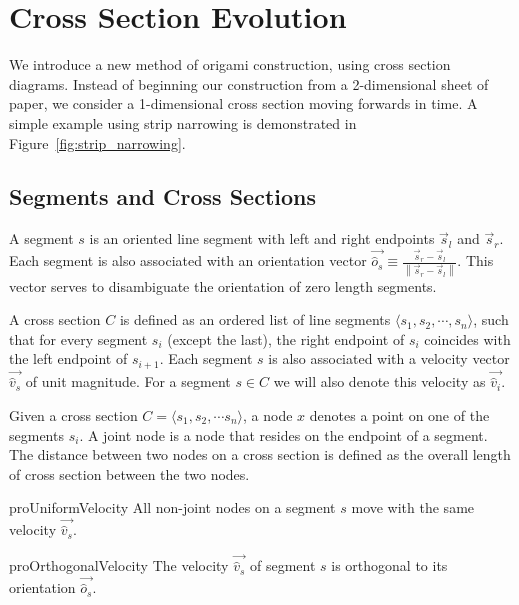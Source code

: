 \section{Cross Section Evolution}
\label{sec:cross_sections}

We introduce a new method of origami construction, using cross section diagrams.
Instead of beginning our construction from a 2-dimensional sheet of paper,
we consider a 1-dimensional cross section moving forwards in time.
A simple example using strip narrowing\cite{strip_narrowing} is demonstrated in Figure~\ref{fig:strip_narrowing}.

\subsection{Segments and Cross Sections}
\label{sec:segments_and_cross_sections}

\begin{definition}
\label{def:segment}
A segment $s$ is an oriented line segment with left and right endpoints $\vec s_l$ and $\vec s_r$.
Each segment is also associated with an orientation vector $\vec{\hat o_s} \equiv\frac{\vec s_r-\vec s_l}{ \left\| \vec s_r-\vec s_l\right\|}$.
This vector serves to disambiguate the orientation of zero length segments.
\end{definition}

\begin{definition}
\label{def:cross_section}
A cross section $C$ is defined as an ordered list of line segments $\langle s_1,s_2,\cdots,s_n\rangle$,
such that for every segment $s_i$ (except the last),
the right endpoint of $s_i$ coincides with the left endpoint of $s_{i+1}$.
Each segment $s$ is also associated with a velocity vector $\vec{\hat v_s}$ of unit magnitude.
For a segment $s\in C$ we will also denote this velocity as $\vec{\hat v_i}$.
\end{definition}

\begin{definition}
\label{def:node}
Given a cross section $C = \langle s_1, s_2,\cdots s_n \rangle$, a node $x$ denotes a point on one of the segments $s_i$.
A joint node is a node that resides on the endpoint of a segment.
The distance between two nodes on a cross section is defined as the overall length of cross section between the two nodes.
\end{definition}

\begin{restatable}{pro}{UniformVelocity}
\label{pro:uniform_velocity}
All non-joint nodes on a segment $s$ move with the same velocity $\vec{\hat v_s}$.
\end{restatable}

\begin{restatable}{pro}{OrthogonalVelocity}
\label{pro:orthogonal_velocity}
The velocity $\vec{\hat v_s}$ of segment $s$ is orthogonal to its orientation $\vec{\hat o_s}$.
\end{restatable}





%
